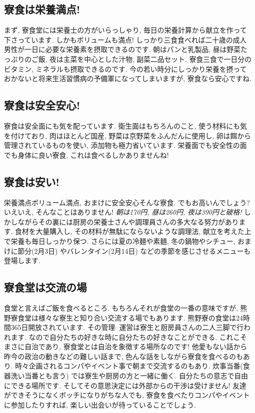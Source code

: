 \documentclass[10pt,b5jsbook,dvips,dvipdfmx,openany]{jsbook}
\theoremstyle{definition}
\begin{document}
		\subsection{寮食は栄養満点! }
 		まず, 寮食堂には栄養士の方がいらっしゃり, 毎日の栄養計算から献立を作って下さっています. しかもボリュームも満点! しっかり三食食べれば二十歳の成人男性が一日に必要な栄養素を摂取できるのです. 朝はパンと乳製品, 昼は野菜たっぷりのご飯, 夜は主菜を中心とした汁物, 副菜二品セット. 寮食三食で一日分のビタミン, ミネラルも摂取できるのです. 今の若い時分にしっかり栄養を摂っておかないと将来生活習慣病の予備軍になってしまいますが, 寮食なら安心ですね.

		\subsection{寮食は安全安心! }
寮食は安全面にも気を配っています. 衛生面はもちろんのこと, 使う材料にも気を付けており, 肉はほとんど国産, 野菜は京野菜をふんだんに使用し, 卵は餌から管理されているものを使い, 添加物も極力省いています. 栄養面でも安全性の面でも身体に良い寮食, これは食べるしかありませんね!

		\subsection{寮食は安い!}

		栄養満点ボリューム満点, おまけに安全安心そんな寮食. でもお高いんでしょう? いえいえ, そんなことはありません! \emph{朝は170円, 昼は260円, 夜は390円と破格! }しかしながらその裏には厨房の栄養士さんや調理員さんの多大なる努力があります. 食材を大量購入し, その材料が無駄にならないような調理法, 献立を考えた上で栄養も毎日しっかり保つ. さらには夏の冷麺や素麺, 冬の鍋物やシチュー, おまけに節分(2月3日) やバレンタイン(2月14日) などの季節を感じさせるメニューも登場します.

		\subsection{寮食堂は交流の場}
		食堂と言えばご飯を食べるところ. もちろんそれが食堂の一番の意味ですが, 熊野寮食堂は様々な寮生と知り合い交流する場でもあります. 熊野寮の食堂は24時間365日開放されています. その管理$ \cdot $ 運営は寮生と厨房員さんの二人三脚で行われます. なので自分たちの好きな時に自分たちの好きなことができる. これこそまさに自治であり, 寮食堂とは自治を象徴する場所なのです! 他愛もない話から昨今の政治の動きなどの難しい話まで, 色んな話をしながら寮食を食べるのもあり. 時々企画されるコンパやイベント事で朝まで交流するのもあり. 炊事当番(食器洗い当番とも言う) では寮生や厨房の方と一緒に働く. 自分たちの意志で自由にできる場所です. そしてその意思決定には外部からの干渉は受けません! 友達ができそうになくボッチになりがちな人でも, 寮食を食べたりコンパやイベントに参加したりすれば, 楽しい出会いが待っていることでしょう.
\end{document}
